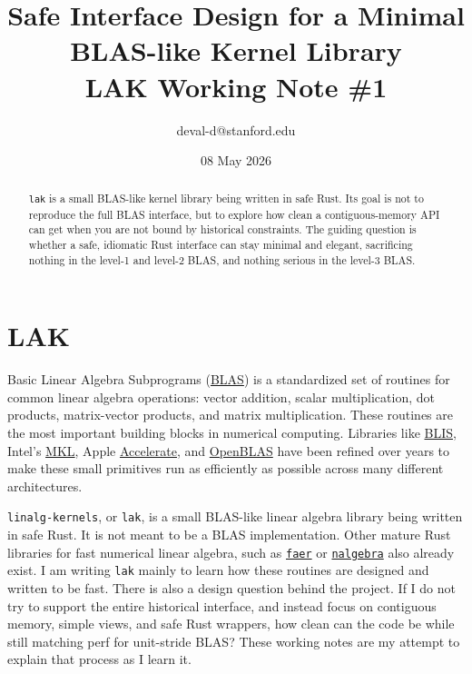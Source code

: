 \documentclass[11pt]{article}
\title{
  Safe Interface Design for a Minimal BLAS-like Kernel Library \\[0.25em]
  \large LAK Working Note \#1
}
\author{
  deval-d@stanford.edu 
}
\date{08 May 2026}
\begin{document}
\maketitle
\thispagestyle{empty} 

\begin{abstract}
\texttt{lak} is a small BLAS-like kernel library being written in safe Rust. Its goal is not to reproduce the full BLAS interface, but to explore how clean a contiguous-memory API can get when you are not bound by historical constraints. The guiding question is whether a safe, idiomatic Rust interface can stay minimal and elegant, sacrificing nothing in the level-1 and level-2 BLAS, and nothing serious in the level-3 BLAS.
\end{abstract}

\section{LAK}

Basic Linear Algebra Subprograms (\href{https://www.netlib.org/blas/}{BLAS})
is a standardized set of routines for common linear algebra operations: vector
addition, scalar multiplication, dot products, matrix-vector products, and
matrix multiplication. These routines are the most important building blocks in numerical computing.
Libraries like \href{https://github.com/flame/blis}{BLIS}, Intel's \href{https://www.intel.com/content/www/us/en/developer/tools/oneapi/onemkl.html}{MKL},
Apple \href{https://developer.apple.com/documentation/accelerate}{Accelerate},
and \href{https://github.com/OpenMathLib/OpenBLAS}{OpenBLAS} have been refined
over years to make these small primitives run as efficiently as possible across
many different architectures.

\texttt{linalg-kernels}, or \texttt{lak}, is a small BLAS-like linear algebra
library being written in safe Rust. It is not meant to be a BLAS implementation. Other mature Rust libraries for fast numerical linear algebra, such as
\href{https://faer.veganb.tw}{\texttt{faer}} or
\href{https://nalgebra.rs}{\texttt{nalgebra}} also already exist. I am writing \texttt{lak}
mainly to learn how these routines are designed and written to be fast.
There is also a design question behind the project. If I do not try to support
the entire historical interface, and instead focus on contiguous memory,
simple views, and safe Rust wrappers, how clean can the code be while still
matching perf for unit-stride BLAS? These working notes are my attempt to explain
that process as I learn it.
\end{document}
